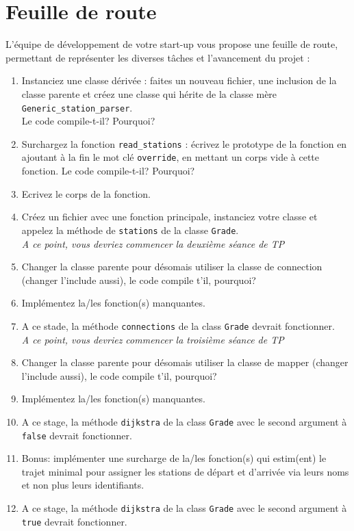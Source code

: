 \documentclass[9pts]{article}
\begin{document}
\section{Feuille de route}

L'équipe de développement de votre start-up vous propose une feuille de route, permettant de représenter les diverses tâches et l'avancement du projet :

\begin{enumerate}
\item Instanciez une classe dérivée : faites un nouveau fichier, une inclusion de la classe parente et créez une classe qui hérite de la classe mère \texttt{Generic\_station\_parser}.\\
Le code compile-t-il? Pourquoi?
\item Surchargez la fonction \texttt{read\_stations} : écrivez le prototype de la fonction en ajoutant à la fin le mot clé \texttt{override}, en mettant un corps vide à cette fonction.
Le code compile-t-il? Pourquoi?
\item Ecrivez le corps de la fonction.
\item Créez un fichier avec une fonction principale, instanciez votre classe et appelez la méthode de \texttt{stations} de la classe \texttt{Grade}.\\

\emph{A ce point, vous devriez commencer la deuxième séance de TP}
\item Changer la classe parente pour désomais utiliser la classe de connection (changer l'include aussi), le code compile t'il, pourquoi?
\item Implémentez la/les fonction(s) manquantes.
\item A ce stade, la méthode \texttt{connections} de la class \texttt{Grade} devrait fonctionner.\\

\emph{A ce point, vous devriez commencer la troisième séance de TP}
\item Changer la classe parente pour désomais utiliser la classe de mapper (changer l'include aussi), le code compile t'il, pourquoi?
\item Implémentez la/les fonction(s) manquantes.
\item A ce stage, la méthode \texttt{dijkstra} de la class \texttt{Grade} avec le second argument à \texttt{false} devrait fonctionner.
\item Bonus: implémenter une surcharge de la/les fonction(s) qui estim(ent) le trajet minimal pour assigner les stations de départ et d'arrivée via leurs noms et non plus leurs identifiants.
\item A ce stage, la méthode \texttt{dijkstra} de la class \texttt{Grade} avec le second argument à \texttt{true} devrait fonctionner.
\end{enumerate}



\end{document}
